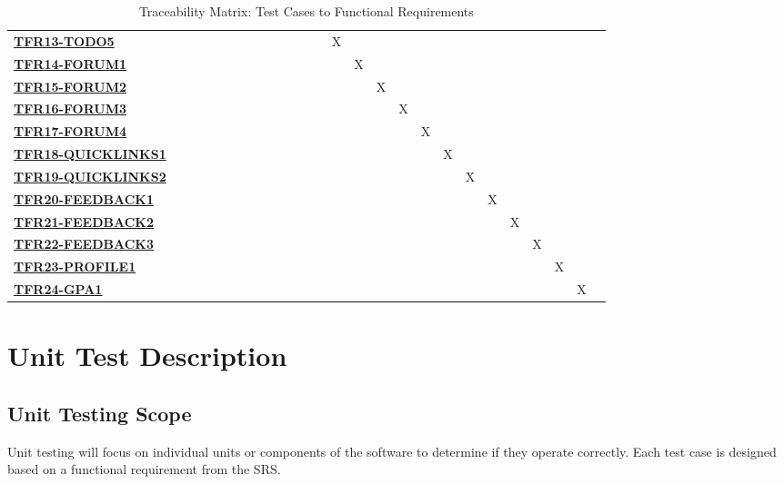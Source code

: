 \documentclass[12pt, titlepage]{article}
\begin{document}
\begin{enumerate}
\begin{table}[ht]
\begin{adjustbox}{width=1.2\textwidth}
\begin{tabular}{l|ccccccccccccccccccccccccc}
        \hyperref[TFR13-TODO5]{\textbf{TFR13-TODO5}} & & & & & & & & & & & & & X & & & & & & & & & & & \\
         \hyperref[TFR14-FORUM1]{\textbf{TFR14-FORUM1}} & & & & & & & & & & & & & & X & & & & & & & & & & \\
        \hyperref[TFR15-FORUM2]{\textbf{TFR15-FORUM2}} & & & & & & & & & & & & & & & X & & & & & & & & & \\
        \hyperref[TFR16-FORUM3]{\textbf{TFR16-FORUM3}} & & & & & & & & & & & & & & & & X & & & & & & & & \\
        \hyperref[TFR17-FORUM4]{\textbf{TFR17-FORUM4}} & & & & & & & & & & & & & & & & & X & & & & & & & \\
        \hyperref[TFR18-QUICKLINKS1]{\textbf{TFR18-QUICKLINKS1}} & & & & & & & & & & & & & & & & & & X & & & & & & \\
        \hyperref[TFR19-QUICKLINKS2]{\textbf{TFR19-QUICKLINKS2}} & & & & & & & & & & & & & & & & & & & X & & & & & \\
        \hyperref[TFR20-FEEDBACK1]{\textbf{TFR20-FEEDBACK1}} & & & & & & & & & & & & & & & & & & & & X & & & & \\
        \hyperref[TFR21-FEEDBACK2]{\textbf{TFR21-FEEDBACK2}} & & & & & & & & & & & & & & & & & & & & & X & & & \\
        \hyperref[TFR22-FEEDBACK3]{\textbf{TFR22-FEEDBACK3}} & & & & & & & & & & & & & & & & & & & & & & X & & \\
        \hyperref[TFR23-PROFILE1]{\textbf{TFR23-PROFILE1}} & & & & & & & & & & & & & & & & & & & & & & & X & \\
        \hyperref[TFR24-GPA1]{\textbf{TFR24-GPA1}} & & & & & & & & & & & & & & & & & & & & & & & & X \\
\hline
\end{tabular}
\end{adjustbox}
\caption{Traceability Matrix: Test Cases to Functional Requirements}
\end{table}




\pagestyle{plain}%
\clearpage

				
% 
\section{Unit Test Description}

\subsection{Unit Testing Scope}
Unit testing will focus on individual units or components of the software to determine if they operate correctly. Each test case is designed based on a functional requirement from the SRS.



\end{enumerate}
\end{document}
